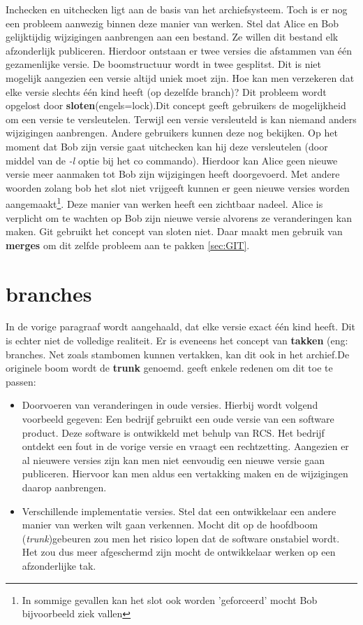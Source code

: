 Inchecken en uitchecken ligt aan de basis van het archiefsysteem. Toch is er nog een probleem aanwezig binnen deze manier van werken. Stel dat Alice en Bob gelijktijdig wijzigingen aanbrengen aan een bestand. Ze willen dit bestand elk afzonderlijk publiceren.  Hierdoor ontstaan er twee versies die afstammen van één gezamenlijke versie. De boomstructuur wordt in twee gesplitst. Dit is niet mogelijk aangezien een versie altijd uniek moet zijn. Hoe kan men verzekeren dat elke versie slechts één kind heeft (op dezelfde branch)? Dit probleem wordt opgelost door \textbf{sloten}(engels=lock).Dit concept geeft gebruikers de mogelijkheid om een versie te  versleutelen. Terwijl een versie versleuteld is kan niemand anders wijzigingen aanbrengen. Andere gebruikers kunnen deze nog bekijken. Op het moment dat Bob zijn versie gaat uitchecken kan hij deze versleutelen (door middel van de \textit{-l} optie bij het co commando). Hierdoor kan Alice geen nieuwe versie meer aanmaken tot Bob zijn wijzigingen heeft doorgevoerd. Met andere woorden zolang bob het slot niet vrijgeeft kunnen er geen nieuwe versies worden aangemaakt\footnote{In sommige gevallen kan het slot ook worden 'geforceerd' mocht Bob bijvoorbeeld ziek vallen}. Deze manier van werken heeft een zichtbaar nadeel. Alice is verplicht om te wachten op Bob zijn nieuwe versie alvorens ze veranderingen kan maken. Git gebruikt het concept van sloten niet. Daar maakt men gebruik van \textbf{merges} om dit zelfde probleem aan te pakken \ref{sec:GIT}.

\section{branches}
\label{par:branches}
In de vorige paragraaf wordt aangehaald, dat elke versie exact één kind heeft. Dit is echter niet de volledige realiteit. Er is eveneens het concept van \textbf{takken} (eng: branches. Net zoals stambomen kunnen vertakken, kan dit ook in het archief.De originele boom wordt de \textbf{trunk} genoemd. \textcite{Tichy85rcs} geeft enkele redenen om dit toe te passen:

\begin{itemize}
\item Doorvoeren van veranderingen in oude versies. Hierbij wordt volgend voorbeeld gegeven: Een bedrijf gebruikt een oude versie van een software product. Deze software is ontwikkeld met behulp van RCS. Het bedrijf ontdekt een fout in de vorige versie en vraagt een rechtzetting. Aangezien er al nieuwere versies zijn kan men niet eenvoudig een nieuwe versie gaan publiceren. Hiervoor kan men aldus een vertakking maken en de wijzigingen daarop aanbrengen.
\item Verschillende implementatie versies. Stel dat een ontwikkelaar een andere manier van werken wilt gaan verkennen. Mocht dit op de hoofdboom (\textit{trunk})gebeuren zou men het risico lopen dat de software onstabiel wordt. Het zou dus meer afgeschermd zijn mocht de ontwikkelaar werken op een afzonderlijke tak.
\end{itemize}

